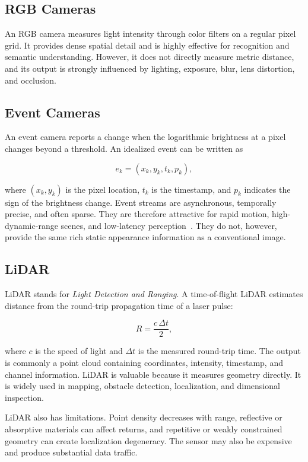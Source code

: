 \subsection{RGB Cameras}

An RGB camera measures light intensity through color filters on a regular pixel grid. It provides dense spatial detail and is highly effective for recognition and semantic understanding. However, it does not directly measure metric distance, and its output is strongly influenced by lighting, exposure, blur, lens distortion, and occlusion.

\subsection{Event Cameras}

An event camera reports a change when the logarithmic brightness at a pixel changes beyond a threshold. An idealized event can be written as

\[
    e_k = (x_k, y_k, t_k, p_k),
\]

where \((x_k,y_k)\) is the pixel location, \(t_k\) is the timestamp, and \(p_k\) indicates the sign of the brightness change. Event streams are asynchronous, temporally precise, and often sparse. They are therefore attractive for rapid motion, high-dynamic-range scenes, and low-latency perception~\cite{gallego2022event,gehrig2024lowlatency}. They do not, however, provide the same rich static appearance information as a conventional image.

\subsection{LiDAR}

LiDAR stands for \emph{Light Detection and Ranging}. A time-of-flight LiDAR estimates distance from the round-trip propagation time of a laser pulse:

\[
    R = \frac{c\,\Delta t}{2},
\]

where \(c\) is the speed of light and \(\Delta t\) is the measured round-trip time. The output is commonly a point cloud containing coordinates, intensity, timestamp, and channel information. LiDAR is valuable because it measures geometry directly. It is widely used in mapping, obstacle detection, localization, and dimensional inspection.

LiDAR also has limitations. Point density decreases with range, reflective or absorptive materials can affect returns, and repetitive or weakly constrained geometry can create localization degeneracy. The sensor may also be expensive and produce substantial data traffic.

